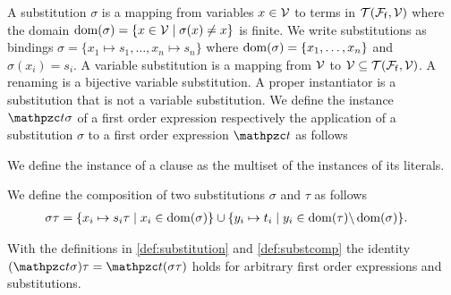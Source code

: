 


\begin{definition}\label{def:substitution}
	A {\myem substitution} $\sigma$ is a mapping from variables $x\in{\mathcal V}$ to terms in ${{\mathcal T}({\mathcal F}_{\mathsf f},{\mathcal V})}$
	where the {\myem domain }$\operatorname{dom}(\sigma) = \{ x\in{\mathcal V}\mid\sigma(x) \neq x \}$ is finite.
	We write substitutions as bindings $\sigma=\{ x_1\mapsto s_1,\ldots,x_n\mapsto s_n \}$
	where $\operatorname{dom}(\sigma)=\{ x_1,\ldots,x_n \}$ and $\sigma(x_i)=s_i$.
	A {\myem variable substitution} is a mapping from ${\mathcal V}$ to ${\mathcal V}\subseteq{{\mathcal T}({\mathcal F}_{\mathsf f},{\mathcal V})}$.
	A {\myem renaming} is a bijective variable substitution.
	A {\myem proper instantiator} is a substitution that is not a variable substitution.
	We define the instance $\mct\sigma$ of a first order expression
	respectively the application of a substitution $\sigma$ to a first order expression $\mct$ as follows

\noindent We define the instance of a clause as the multiset of the instances of its literals.
\end{definition}

\begin{definition}\label{def:substcomp}
We define the {\myem composition} of two substitutions $\sigma$ and $\tau$ as follows
	\begin{align*}
		\sigma\tau&=\{ x_i\mapsto s_i\tau\mid x_i\in\operatorname{dom}(\sigma) \}
		\cup
		\{ y_i\mapsto t_i\mid y_i\in\operatorname{dom}(\tau) \backslash \operatorname{dom}(\sigma) \}.
	\end{align*}
\end{definition}



\begin{lemma}\label{lem:substitution}
	With the definitions in \ref{def:substitution} and \ref{def:substcomp} the identity
	$(\mct\sigma)\tau = \mct(\sigma\tau)$ holds for
	arbitrary first order expressions and substitutions.
\end{lemma}